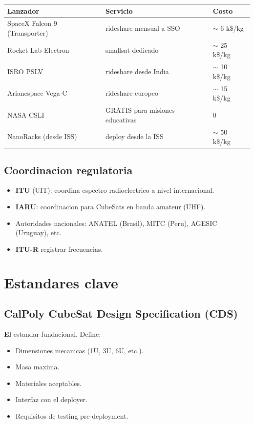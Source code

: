 \documentclass[11pt,a4paper,oneside,openright]{book}
\begin{document}
\begin{center}
\begin{tabular}{lp{8cm}p{2cm}}
\toprule
\textbf{Lanzador} & \textbf{Servicio} & \textbf{Costo} \\
\midrule
SpaceX Falcon 9 (Transporter) & rideshare mensual a SSO          & $\sim$ 6 k\$/kg \\
Rocket Lab Electron            & smallsat dedicado                & $\sim$ 25 k\$/kg \\
ISRO PSLV                      & rideshare desde India            & $\sim$ 10 k\$/kg \\
Arianespace Vega-C             & rideshare europeo                & $\sim$ 15 k\$/kg \\
NASA CSLI                       & GRATIS para misiones educativas  & 0 \\
NanoRacks (desde ISS)           & deploy desde la ISS              & $\sim$ 50 k\$/kg \\
\bottomrule
\end{tabular}
\end{center}

\section{Coordinacion regulatoria}

\begin{itemize}[leftmargin=2em]
  \item \textbf{ITU} (UIT): coordina espectro radioelectrico a nivel
        internacional.
  \item \textbf{IARU}: coordinacion para CubeSats en banda amateur (UHF).
  \item Autoridades nacionales: ANATEL (Brasil), MITC (Peru), AGESIC
        (Uruguay), etc.
  \item \textbf{ITU-R} registrar frecuencias.
\end{itemize}

\chapter{Estandares clave}
\label{ch:estandares}

\section{CalPoly CubeSat Design Specification (CDS)}

\textbf{El} estandar fundacional. Define:
\begin{itemize}[leftmargin=2em]
  \item Dimensiones mecanicas (1U, 3U, 6U, etc.).
  \item Masa maxima.
  \item Materiales aceptables.
  \item Interfaz con el deployer.
  \item Requisitos de testing pre-deployment.
\end{itemize}
\end{document}

